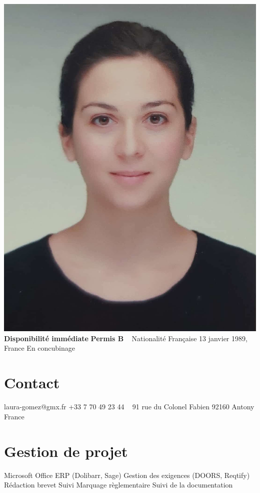 \documentclass{cv-style}     %
\begin{document}


\begin{aside}
    \includegraphics[width=.8\columnwidth]{img/LG}
    \textbf{Disponibilité immédiate}
    \textbf{Permis B}
    ~
    Nationalité Française
    13 janvier 1989, France
    En concubinage
    \section{Contact}
    laura-gomez@gmx.fr
    +33 7 70 49 23 44
    ~
    91 rue du Colonel Fabien
    92160 Antony
    France
    \section{Gestion de projet}
    Microsoft Office
    ERP (Dolibarr, Sage)
    Gestion des exigences (DOORS, Reqtify)
    ~
    Rédaction brevet
    Suivi Marquage règlementaire
    Suivi de la documentation

\end{aside}
\end{document}
